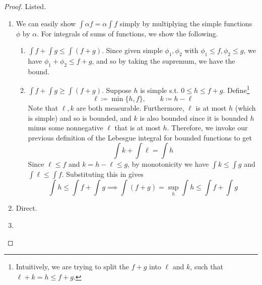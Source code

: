   \begin{proof}
    Listed. 
    \begin{enumerate}
      \item We can easily show $\int \alpha f = \alpha \int f$ simply by multiplying the simple functions $\phi$ by $\alpha$. For integrals of sums of functions, we show the following. 
      \begin{enumerate}
        \item $\int f + \int g \leq \int (f + g)$. Since given simple $\phi_1, \phi_2$ with $\phi_1 \leq f, \phi_2 \leq g$, we have $\phi_1 + \phi_2 \leq f + g$, and so by taking the supremum, we have the bound. 

        \item $\int f + \int g \geq \int (f + g)$. Suppose $h$ is simple s.t. $0 \leq h \leq f + g$. Define\footnote{Intuitively, we are trying to split the $f + g$ into $\ell$ and $k$, such that $\ell + k = h \leq f + g$.} 
          \begin{equation}
            \ell \coloneqq \min\{h, f\}, \qquad k \coloneqq h - \ell
          \end{equation}
          Note that $\ell, k$ are both measurable. Furthermore, $\ell$ is at most $h$ (which is simple) and so is bounded, and $k$ is also bounded since it is bounded $h$ minus some nonnegative $\ell$ that is at most $h$. Therefore, we invoke our previous definition of the Lebesgue integral for bounded functions to get 
          \begin{equation}
            \int k + \int \ell = \int h
          \end{equation}
          Since $\ell \leq f$ and $k = h - \ell \leq g$, by monotonicity we have $\int k \leq \int g$ and $\int \ell \leq \int f$. Substituting this in gives 
          \begin{equation}
            \int h \leq \int f + \int g \implies \int (f + g) = \sup_h \int h \leq \int f + \int g
          \end{equation}
        \end{enumerate}
      \item Direct. 
      \item 
    \end{enumerate}
  \end{proof}

